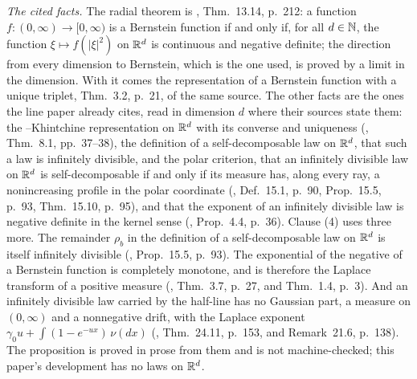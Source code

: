 

\emph{The cited facts.} The radial theorem is , Thm.~13.14,
p.~212: a function $f : (0,\infty) \to [0,\infty)$ is a Bernstein function if and only if, for all
$d \in \mathbb{N}$, the function $\xi \mapsto f(|\xi|^2)$ on $\mathbb{R}^d$ is continuous and negative
definite; the direction from every dimension to Bernstein, which is the one used, is proved by a
limit in the dimension. With it comes the representation of a Bernstein function with a unique
triplet, Thm.~3.2, p.~21, of the same source. The other facts are the ones the line paper
already cites, read in dimension $d$ where their sources state them: the \Levy--Khintchine
representation on $\mathbb{R}^d$ with its converse and uniqueness (, Thm.~8.1,
pp.~37--38), the definition of a self-decomposable law on $\mathbb{R}^d$, that such a law is infinitely
divisible, and the polar criterion, that an infinitely divisible law on $\mathbb{R}^d$ is
self-decomposable if and only if its \Levy{} measure has, along every ray, a nonincreasing
profile in the polar coordinate (, Def.~15.1, p.~90, Prop.~15.5, p.~93,
Thm.~15.10, p.~95), and that the exponent of an infinitely divisible law is negative definite in
the kernel sense (, Prop.~4.4, p.~36). Clause (4) uses three
more. The remainder $\rho_b$ in the definition of a self-decomposable law on $\mathbb{R}^d$ is itself
infinitely divisible (, Prop.~15.5, p.~93). The exponential of the
negative of a Bernstein function is completely monotone, and is therefore the Laplace
transform of a positive measure (, Thm.~3.7, p.~27, and
Thm.~1.4, p.~3). And an infinitely divisible law carried by the half-line has no Gaussian
part, a \Levy{} measure on $(0,\infty)$ and a nonnegative drift, with the Laplace exponent
$\gamma_0u + \int(1 - e^{-ux})\,\nu(dx)$ (, Thm.~24.11, p.~153, and
Remark~21.6, p.~138). The proposition is proved
in prose from them and is not machine-checked; this paper's development has no laws on
$\mathbb{R}^d$.

